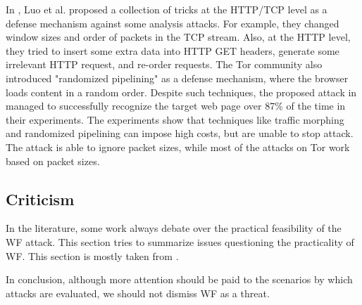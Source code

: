 In \cite{luo2011}, Luo et al. proposed a collection of tricks at the HTTP/TCP level as a defense mechanism against some analysis attacks. For example, they changed window sizes and order of packets in the TCP stream. Also, at the HTTP level, they tried to insert some extra data into HTTP GET headers, generate some irrelevant HTTP request, and re-order requests. The Tor community also introduced "randomized pipelining" \cite{perry11} as a defense mechanism, where the browser loads content in a random order. Despite such techniques, the proposed attack in \cite{cai2012touching} managed to successfully recognize the target web page over 87\% of the time in their experiments. The experiments show that techniques like traffic morphing and randomized pipelining can impose high costs, but are unable to stop attack. The attack is able to ignore packet sizes, while most of the attacks on Tor work based on packet sizes.

\subsection{Criticism}
In the literature, some work always debate over the practical feasibility of the WF attack. This section tries to summarize issues questioning the practicality of WF. This section is mostly taken from \cite{TorBlog, juarez14}.


In conclusion, although more attention should be paid to the scenarios by which attacks are evaluated, we should not dismiss WF as a threat.
